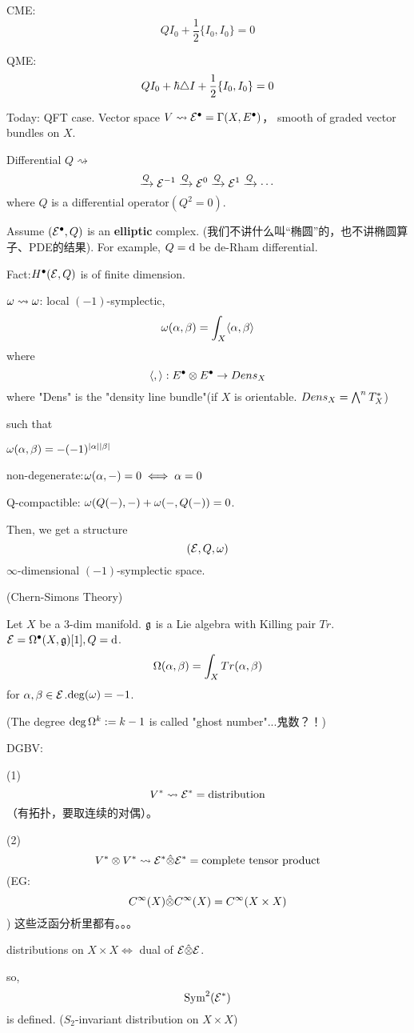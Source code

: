 CME:
$$QI_0+\frac{1}{2}\{I_0,I_0\}=0$$

QME:
$$QI_0+\hbar\triangle I+\frac{1}{2}\{I_0,I_0\}=0$$

Today: QFT case.
Vector space $V\rightsquigarrow\mathcal{E}^{\bullet}=\Gamma(X,E^{\bullet})$，
smooth of graded vector bundles on $X$.

Differential $Q\rightsquigarrow$
$$\xrightarrow{Q}\mathcal{E}^{-1}\xrightarrow{Q}\mathcal{E}^{0}\xrightarrow{Q}\mathcal{E}^{1}\xrightarrow{Q}\cdots$$
where $Q$ is a differential operator$(Q^2=0)$.

Assume $(\mathcal{E}^{\bullet},Q)$ is an \textbf{elliptic} complex.
(我们不讲什么叫“椭圆”的，也不讲椭圆算子、PDE的结果).
For example, $Q=\mathrm{d}$ be de-Rham differential.

Fact:$H^{\bullet}(\mathcal{E},Q)$ is of finite dimension.

$\omega\rightsquigarrow\omega$: local $(-1)$-symplectic,
$$\omega(\alpha,\beta)=\int_X\langle\alpha,\beta\rangle$$
where
$$\langle,\rangle: E^{\bullet}\otimes E^{\bullet}\to Dens_X$$
where "Dens" is the "density line bundle"(if $X$ is orientable. $Dens_X=\bigwedge\nolimits^{n}T_X^*$)

such that

$\omega(\alpha,\beta)=-(-1)^{|\alpha||\beta|}$

non-degenerate:$\omega(\alpha,-)=0\iff\alpha=0$

Q-compactible:
$\omega(Q(-),-)+\omega(-,Q(-))=0$.

Then, we get a structure
$$(\mathcal{E},Q,\omega)$$
$\infty$-dimensional $(-1)$-symplectic space.

\begin{example}(Chern-Simons Theory)

Let $X$ be a $3$-dim manifold. $\mathfrak{g}$ is a Lie algebra
with Killing pair $Tr$. $\mathcal{E}=\Omega^{\bullet}(X,\mathfrak{g})[1],Q=\mathrm{d}$.
$$\Omega(\alpha,\beta)=\int_XTr(\alpha,\beta)$$
for $\alpha,\beta\in\mathcal{E}$.$\deg(\omega)=-1$.
\end{example}
(The degree $\deg\Omega^k:=k-1$ is called "ghost number"...鬼数？！)

DGBV:

(1)
$$V^*\rightsquigarrow\mathcal{E}^*=\text{distribution}$$
（有拓扑，要取连续的对偶）。

(2)
$$V^*\otimes V^*\rightsquigarrow\mathcal{E}^*\hat{\otimes}\mathcal{E}^*=\text{complete tensor product}$$
(EG:$$C^\infty(X)\hat{\otimes}C^\infty(X)=C^{\infty}(X\times X)$$
)
这些泛函分析里都有。。。

distributions on $X\times X\iff$ dual of $\mathcal{E}\hat{\otimes}\mathcal{E}$.

so,
$$\operatorname{Sym}^2(\mathcal{E}^*)$$
is defined.
($S_2$-invariant distribution on $X\times X$)

